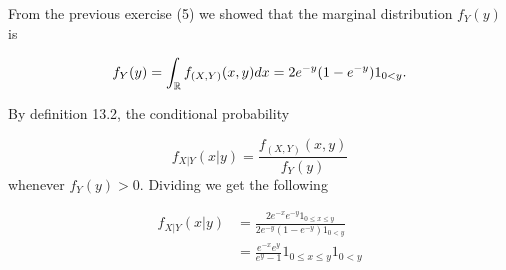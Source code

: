 
From the previous exercise (5) we showed that the marginal distribution $ f_{Y} (y)$ is

\[
    f_{Y} (y) = \int_{\mathbb{R}}  f_{(X,Y)} (x,y) dx = 2e^{-y} (1- e^{-y} ) 1_{0 < y}   
.\] 

By definition 13.2, the conditional probability 

\[
    f_{X|Y} (x|y) = \frac{f_{(X,Y)} (x,y)}{f_{Y} (y)} 
\] 
whenever $ f_{Y} (y) > 0$. Dividing we get the following

\begin{align*}
    f_{X|Y} (x|y) &= \frac{2 e^{-x} e^{-y} 1_{0 \leq x \leq y} }{2 e^{-y} (1-e^{-y} )1_{0 < y}  } \\
		  &= \frac{e^{-x} e^{y} }{e^{y} -1} 1_{0 \leq x \leq y} 1_{0 < y}  
\end{align*}
